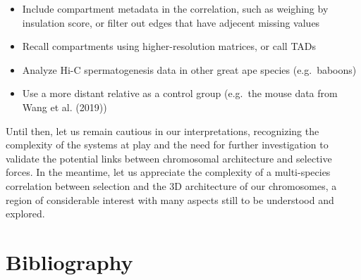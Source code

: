 \documentclass[
  11pt,
  a4paper,
]{scrbook}
\providecommand{\tightlist}{%
  \setlength{\itemsep}{0pt}\setlength{\parskip}{0pt}}
\begin{document}
\begin{itemize}
\tightlist
\item
  Include compartment metadata in the correlation, such as weighing by
  insulation score, or filter out edges that have adjecent missing
  values
\item
  Recall compartments using higher-resolution matrices, or call TADs
\item
  Analyze Hi-C spermatogenesis data in other great ape species
  (e.g.~baboons)
\item
  Use a more distant relative as a control group (e.g.~the mouse data
  from Wang et al. (2019))
\end{itemize}

Until then, let us remain cautious in our interpretations, recognizing
the complexity of the systems at play and the need for further
investigation to validate the potential links between chromosomal
architecture and selective forces. In the meantime, let us appreciate
the complexity of a multi-species correlation between selection and the
3D architecture of our chromosomes, a region of considerable interest
with many aspects still to be understood and explored.

\chapter*{Bibliography}\label{bibliography}
\end{document}
